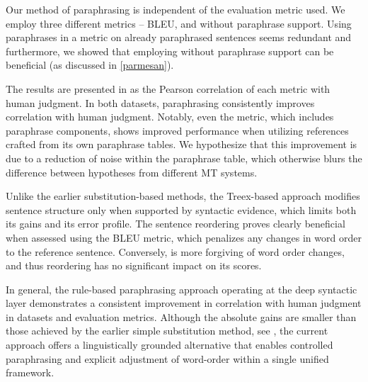 Our method of paraphrasing is independent of the evaluation metric used. We employ three different metrics -- BLEU, \mn and \mn without paraphrase support. Using paraphrases in a metric on already paraphrased sentences seems redundant and furthermore, we showed that employing \mn without paraphrase support can be beneficial (as discussed in \cref{parmesan}). 

The results are presented in  as the Pearson correlation of each metric with human judgment. In both datasets, paraphrasing consistently improves correlation with human judgment. Notably, even the \mn metric, which includes paraphrase components, shows improved performance when utilizing references crafted from its own paraphrase tables. We hypothesize that this improvement is due to a reduction of noise within the paraphrase table, which otherwise blurs the difference between hypotheses from different MT systems.


Unlike the earlier substitution-based methods, the Treex-based approach modifies sentence structure only when supported by syntactic evidence, which limits both its gains and its error profile. The sentence reordering proves clearly beneficial when assessed using the BLEU metric, which penalizes any changes in word order to the reference sentence. Conversely, \mn is more forgiving of word order changes, and thus reordering has no significant impact on its scores.

In general, the rule-based paraphrasing approach operating at the deep syntactic layer demonstrates a consistent improvement in correlation with human judgment in datasets and evaluation metrics. Although the absolute gains are smaller than those achieved by the earlier simple substitution method, see , the current approach offers a linguistically grounded alternative that enables controlled paraphrasing and explicit adjustment of word-order within a single unified framework.

